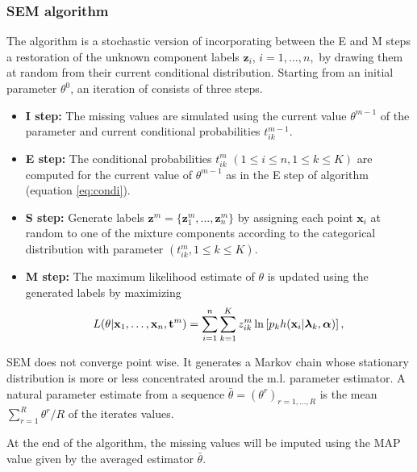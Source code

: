 \documentclass[shortnames,nojss,article]{jss}
\newcommand{\bx}{\mathbf{x}}
\newcommand{\bz}{\mathbf{z}}
\newcommand{\bt}{\mathbf{t}}
\newcommand{\balpha}{\boldsymbol{\alpha}}
\newcommand{\blambda}{\boldsymbol{\lambda}}
\begin{document}
\subsubsection{SEM algorithm}\label{subsubsec:SEM}
The  algorithm is a stochastic version of  incorporating
between the E and M steps a restoration of the unknown component labels
$\bz_i$, $i=1,\ldots,n,$ by drawing them at random from their current
conditional distribution. Starting from an initial parameter $\theta^0$, an
iteration of  consists of three steps.
\begin{itemize}
\item {\bf I step:} The missing values are simulated using the current value
$\theta^{m-1}$ of the parameter and current conditional probabilities
$t^{m-1}_{ik}$.

\item {\bf E step:} The conditional probabilities $t^m_{ik}$ $(1 \leq i \leq n,
1 \leq k \leq K)$ are computed for the current value of $\theta^{m-1}$ as in
the E step of  algorithm (equation \ref{eq:condi}).

\item {\bf S step:} Generate labels ${\bz}^m=\{ {\bz}^m_1,...,{\bz}^m_n\}$
by assigning each point ${\bx}_i$ at random to one of the mixture
components according to the categorical distribution with parameter
$(t^m_{ik}, 1 \leq k \leq K)$.

\item {\bf M step:} The maximum likelihood estimate of $\theta$ is updated
using the generated labels by maximizing
\begin{equation} \label{eq:mStepSEM}
  L(\theta| {\bx}_{1},\ldots,{\bx}_{n}, {\bt}^m)
    =\sum_{i=1}^{n}\sum_{k=1}^{K} z_{ik}^m \ln \left [p_{k} h({\bf x}_{i}|\blambda_{k},\balpha)\right],
\end{equation}
\end{itemize}

SEM does not converge point wise. It generates a Markov chain whose stationary
distribution is more or less concentrated around the m.l. parameter estimator. A
natural parameter estimate from a  sequence
$\bar{\theta}=(\theta^r)_{r=1,\ldots,R}$ is the mean $\sum_{r=1}^R \theta^r/R$
of the iterates values.

At the end of the algorithm, the missing values will be imputed using the
MAP value given by the averaged estimator $\bar{\theta}$.
\end{document}
